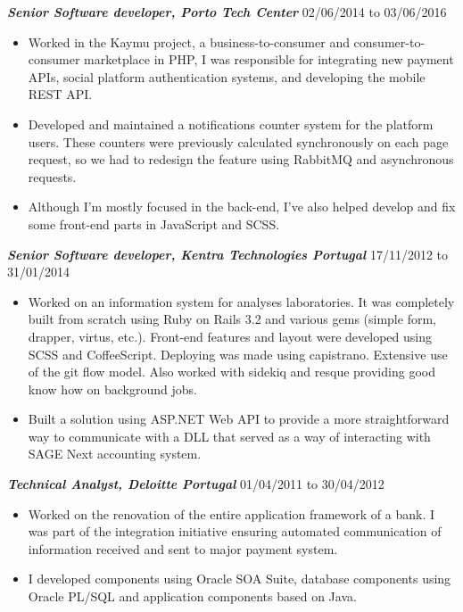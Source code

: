 \documentclass[line,margin]{resume}
\begin{document}
\begin{resume}
    {\sl\bf Senior Software developer, Porto Tech Center} \hfill 02/06/2014 to 03/06/2016
    \begin{itemize}
		\item Worked in the Kaymu project, a business-to-consumer and consumer-to-consumer marketplace in PHP, I was responsible for integrating new payment APIs, social platform authentication systems, and developing the mobile REST API.
		\item Developed and maintained a notifications counter system for the platform users. These counters were previously calculated synchronously on each page request, so we had to redesign the feature using RabbitMQ and asynchronous requests.
		\item Although I'm mostly focused in the back-end, I've also helped develop and fix some front-end parts in JavaScript and SCSS.
    \end{itemize}
    {\sl\bf Senior Software developer, Kentra Technologies Portugal} \hfill 17/11/2012 to 31/01/2014
    \begin{itemize}
        \item Worked on an information system for analyses laboratories. It was completely built from scratch using Ruby on Rails 3.2 and various gems (simple form, drapper, virtus, etc.). Front-end features and layout were developed using SCSS and CoffeeScript. Deploying was made using capistrano. Extensive use of the git flow model. Also worked with sidekiq and resque providing good know how on background jobs.
        \item Built a solution using ASP.NET Web API to provide a more straightforward way to communicate with a DLL that served as a way of interacting with SAGE Next accounting system.
    \end{itemize}

    {\sl\bf Technical Analyst, Deloitte Portugal} \hfill 01/04/2011 to 30/04/2012
    \begin{itemize}
        \item Worked on the renovation of the entire application framework of a bank. I was part of the integration initiative ensuring automated communication of information received and sent to major payment system.
        \item I developed components using Oracle SOA Suite, database components using Oracle PL/SQL and application components based on Java.
    \end{itemize}


\end{resume}
\end{document}
